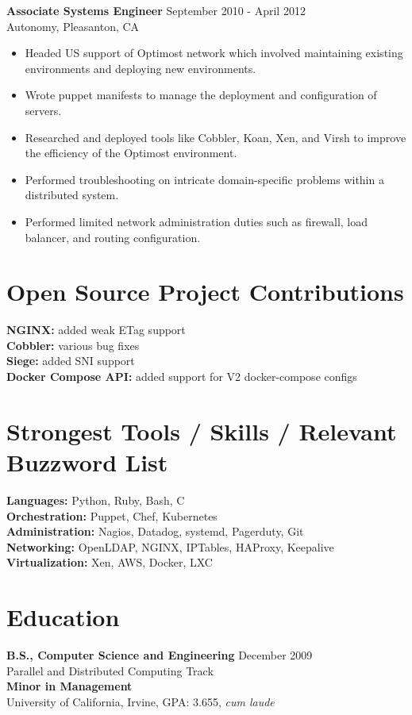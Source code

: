 \documentclass[12pt,line,letterpaper]{res}
\begin{document}
\begin{resume}
    {\bf Associate Systems Engineer} \hfill September 2010 - April 2012 \\
    Autonomy, Pleasanton, CA
    \begin{itemize} \itemsep -2pt
    \item Headed US support of Optimost network which involved maintaining existing environments and deploying new environments.
    \item Wrote puppet manifests to manage the deployment and configuration of servers.
    \item Researched and deployed tools like Cobbler, Koan, Xen, and Virsh to improve the efficiency of the Optimost environment.
    \item Performed troubleshooting on intricate domain-specific problems within a distributed system.
    \item Performed limited network administration duties such as firewall, load balancer, and routing configuration.
    \end{itemize}

\section {Open Source Project Contributions}
    {\bf NGINX:} added weak ETag support \\
    {\bf Cobbler:} various bug fixes \\
    {\bf Siege:} added SNI support \\
    {\bf Docker Compose API:} added support for V2 docker-compose configs

\section{Strongest Tools / Skills / Relevant Buzzword List}
    {\bf Languages:} Python, Ruby, Bash, C \\
    {\bf Orchestration:} Puppet, Chef, Kubernetes \\
    {\bf Administration:} Nagios, Datadog, systemd, Pagerduty, Git \\
    {\bf Networking:} OpenLDAP, NGINX, IPTables, HAProxy, Keepalive \\
    {\bf Virtualization:} Xen, AWS, Docker, LXC

\section{Education}
    {\bf B.S., Computer Science and Engineering} \hfill December 2009 \\
    Parallel and Distributed Computing Track \\
    {\bf Minor in Management} \\
    University of California, Irvine, GPA: 3.655, \textit{cum laude}

\end{resume}
\end{document}
